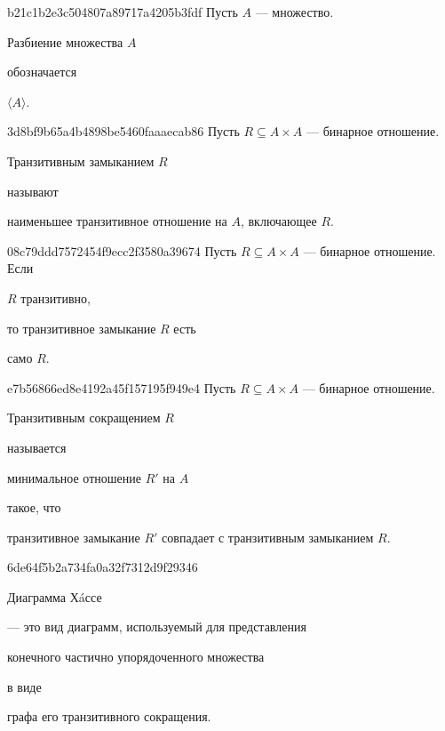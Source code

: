 \begin{note}{b21c1b2e3c504807a89717a4205b3fdf}
    Пусть \({ A }\) --- множество.
    \begin{icloze}{2}Разбиение множества \({ A }\)\end{icloze} обозначается \begin{icloze}{1}\({ \langle A \rangle }\).\end{icloze}
\end{note}

\begin{note}{3d8bf9b65a4b4898be5460faaaecab86}
    Пусть \({ R \subseteq A \times A }\) --- бинарное отношение.
    \begin{icloze}{2}Транзитивным замыканием \({ R }\)\end{icloze} называют \begin{icloze}{1}наименьшее транзитивное отношение на \({ A }\), включающее \({ R }\).\end{icloze}
\end{note}

\begin{note}{08c79ddd7572454f9ecc2f3580a39674}
    Пусть \({ R \subseteq A \times A }\) --- бинарное отношение.
    Если \begin{icloze}{2}\({ R }\) транзитивно,\end{icloze} то транзитивное замыкание \({ R }\) есть \begin{icloze}{1}само \({ R }\).\end{icloze}
\end{note}

\begin{note}{e7b56866ed8e4192a45f157195f949e4}
    Пусть \({ R \subseteq A \times A }\) --- бинарное отношение.
    \begin{icloze}{3}Транзитивным сокращением \({ R }\)\end{icloze} называется \begin{icloze}{2}минимальное отношение \({ R' }\) на \({ A }\)\end{icloze} такое, что \begin{icloze}{1}транзитивное замыкание \({ R' }\) совпадает с транзитивным замыканием \({ R }\).\end{icloze}
\end{note}

\begin{note}{6de64f5b2a734fa0a32f7312d9f29346}
    \begin{icloze}{3}Диаграмма Хáссе\end{icloze} --- это вид диаграмм, используемый для представления \begin{icloze}{1}конечного частично упорядоченного множества\end{icloze} в виде \begin{icloze}{2}графа его транзитивного сокращения.\end{icloze}
\end{note}

